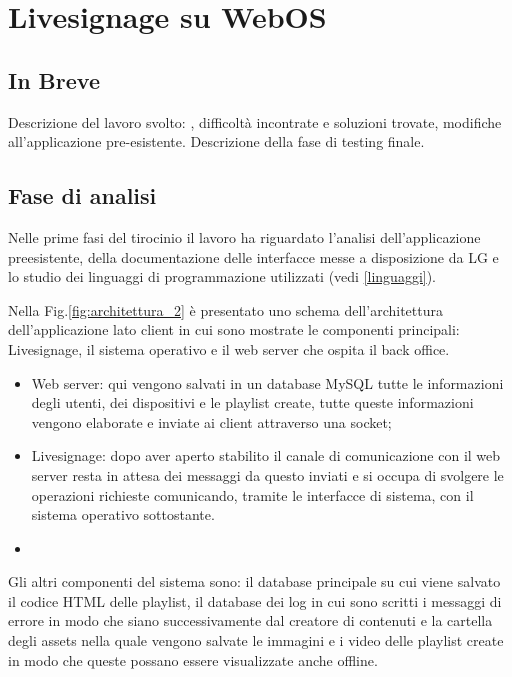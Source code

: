 \chapter{Livesignage su WebOS}\label{svolgimento}
\section{In Breve}
Descrizione del lavoro svolto: , difficoltà incontrate e soluzioni trovate, modifiche all'applicazione pre-esistente. Descrizione della fase di testing finale.

\section{Fase di analisi}

Nelle prime fasi del tirocinio il lavoro ha riguardato l'analisi dell'applicazione preesistente, della documentazione delle interfacce messe a disposizione da LG e lo studio dei linguaggi di programmazione utilizzati (vedi \ref*{linguaggi}).

Nella Fig.\ref*{fig:architettura_2} è presentato uno schema dell'architettura dell'applicazione lato client in cui sono mostrate le componenti principali: Livesignage, il sistema operativo e il web server che ospita il back office.

\begin{itemize}
    \item Web server: qui vengono salvati in un database MySQL tutte le informazioni degli utenti, dei dispositivi e le playlist create, tutte queste informazioni vengono elaborate e inviate ai client attraverso una socket;
    \item Livesignage: dopo aver aperto stabilito il canale di comunicazione con il web server resta in attesa dei messaggi da questo inviati e si occupa di svolgere le operazioni richieste comunicando, tramite le interfacce di sistema, con il sistema operativo sottostante.
    \item {}
\end{itemize}

Gli altri componenti del sistema sono: il database principale su cui viene salvato il codice HTML delle playlist, il database dei log in cui sono scritti i messaggi di errore in modo che siano successivamente  dal creatore di contenuti e la cartella degli assets nella quale vengono salvate le immagini e i video delle playlist create in modo che queste possano essere visualizzate anche offline.

